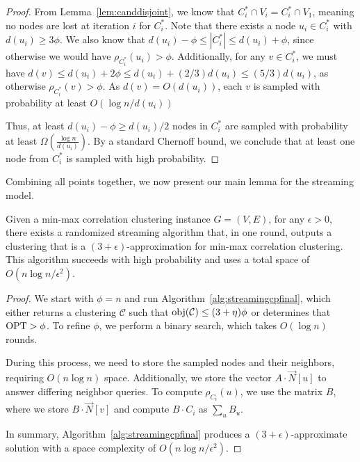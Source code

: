 \begin{proof}
From Lemma~\ref{lem:canddisjoint}, we know that $C^*_i \cap V_i = C^*_i \cap V_1$, meaning no nodes are lost at iteration $i$ for $C^*_i$. Note that there exists a node $u_i \in C^*_i$ with $d(u_i) \geq 3\phi$. We also know that $d(u_i) - \phi \leq |C^*_i| \leq d(u_i) + \phi$, since otherwise we would have $\rho_{C^*_i}(u_i) > \phi$. Additionally, for any $v \in C^*_i$, we must have $d(v) \leq d(u_i) + 2\phi \leq d(u_i) + (2/3)d(u_i) \leq (5/3) d(u_i)$, as otherwise $\rho_{C^*_i}(v) > \phi$. As $d(v) = O(d(u_i))$, each $v$ is sampled with probability at least $O(\log n / d(u_i))$

Thus, at least $d(u_i) - \phi \geq d(u_i) / 2$ nodes in $C^{*}_i$ are sampled with probability at least $\Omega(\frac{\log n}{d(u_i)})$. By a standard Chernoff bound, we conclude that at least one node from $C^*_i$ is sampled with high probability.
\end{proof}

Combining all points together, we now present our main lemma for the streaming model.

\begin{lemma}
\label{lemma:mainresultstreaming}
Given a min-max correlation clustering instance $G = (V, E)$, for any $\epsilon > 0$, there exists a randomized streaming algorithm that, in one round, outputs a clustering that is a $(3 + \epsilon)$-approximation for min-max correlation clustering. This algorithm succeeds with high probability and uses a total space of $O(n \log n/\epsilon^2)$.
\end{lemma}

\begin{proof}
We start with $\phi = n$ and run Algorithm~\ref{alg:streamingcpfinal}, which either returns a clustering $\mathcal{C}$ such that $\mathrm{obj}(\mathcal{C}) \leq (3 + \eta) \phi$ or determines that $\mathrm{OPT} > \phi$. To refine $\phi$, we perform a binary search, which takes $O(\log n)$ rounds.

During this process, we need to store the sampled nodes and their neighbors, requiring $O(n\log n)$ space. Additionally, we store the vector $A\cdot \vec{N}[u]$ to answer differing neighbor queries. To compute $\rho_{C_i}(u)$, we use the matrix $B$, where we store $B \cdot \vec{N}[v]$ and compute $B\cdot C_i$ as $\sum_{u} B_u$. 

In summary, Algorithm~\ref{alg:streamingcpfinal} produces a $(3+\epsilon)$-approximate solution with a space complexity of $O(n \log n / \epsilon^2)$.
\end{proof}


